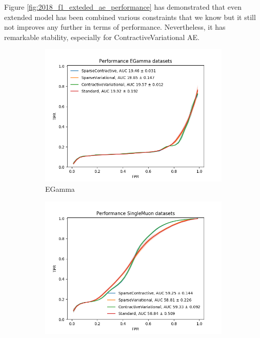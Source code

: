 Figure \ref{fig:2018_f1_exteded_ae_performance} has demonstrated that even extended model has been combined various constraints that we know but it still not improves any further in terms of performance. Nevertheless, it has remarkable stability, especially for ContractiveVariational AE.

\begin{figure}[h!]
\centering
    \begin{subfigure}[b]{0.49\linewidth}
        \includegraphics[width=\linewidth]{images/reco/2018/feature_1/performance_EGamma_SparseContractiveSparseVariationalContractiveVariationalStandard.png}
        \caption{EGamma}
    \end{subfigure}
    \begin{subfigure}[b]{0.49\linewidth}
        \includegraphics[width=\linewidth]{images/reco/2018/feature_1/performance_SingleMuon_SparseContractiveSparseVariationalContractiveVariationalStandard.png}

\end{subfigure}
\end{figure}
